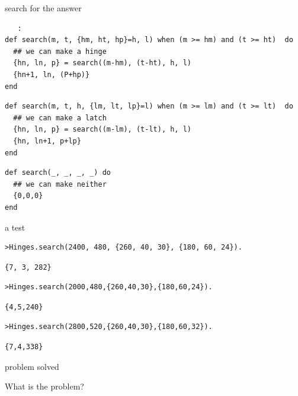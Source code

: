 \begin{frame}[fragile]{search for the answer}

\begin{verbatim}
   :
def search(m, t, {hm, ht, hp}=h, l) when (m >= hm) and (t >= ht)  do
  ## we can make a hinge
  {hn, ln, p} = search((m-hm), (t-ht), h, l)
  {hn+1, ln, (P+hp)}
end
\end{verbatim}\pause
\begin{verbatim}
def search(m, t, h, {lm, lt, lp}=l) when (m >= lm) and (t >= lt)  do
  ## we can make a latch
  {hn, ln, p} = search((m-lm), (t-lt), h, l)
  {hn, ln+1, p+lp}
end
\end{verbatim}\pause
\begin{verbatim}
def search(_, _, _, _) do
  ## we can make neither
  {0,0,0}
end
\end{verbatim}
\end{frame}


\begin{frame}[fragile]{a test}

\begin{verbatim}
>Hinges.search(2400, 480, {260, 40, 30}, {180, 60, 24}).
\end{verbatim}
\pause
\begin{verbatim}
{7, 3, 282}
\end{verbatim}
\pause
\begin{verbatim}
>Hinges.search(2000,480,{260,40,30},{180,60,24}).
\end{verbatim}
\pause
\begin{verbatim}
{4,5,240}
\end{verbatim}
\begin{verbatim}
>Hinges.search(2800,520,{260,40,30},{180,60,32}).
\end{verbatim}
\pause
\begin{verbatim}
{7,4,338}
\end{verbatim}

\end{frame}

\begin{frame}{problem solved}

\pause
\vspace{40pt}\hspace{140pt}What is the problem?

\end{frame}

